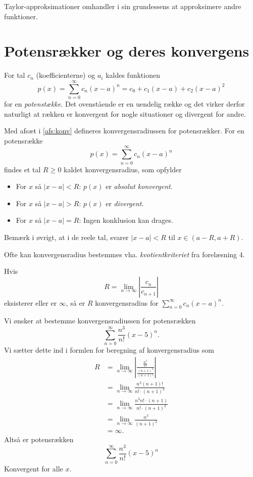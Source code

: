 Taylor-approksimationer omhandler i sin grundessens at approksimere andre funktioner. 

\section{Potensrækker og deres konvergens}
\begin{definition} [Potensrækker]
  For tal $c_n$ (koefficienterne) og $a_i$ kaldes funktionen
  \[ 
  p(x) = \sum_{n = 0}^{\infty} c_n(x-a)^{n} = c_0 + c_1(x-a) + c_2(x-a)^2
  \]
  for en \textit{potenstække}. Det ovenstående er en uendelig række og det virker derfor naturligt at rækken er konvergent for nogle situationer og divergent for andre.
\end{definition}

\begin{sæt} [Konvergensradius]
  Med afsæt i \autoref{afs:konv} defineres konvergensradiussen for potensrækker. For en potensrække
  \[ 
  p(x) = \sum_{n = 0}^{\infty} c_n(x-a)^{n}
  \]
  findes et tal $R \geq 0$ kaldet konvergensradius, som opfylder
  \begin{itemize}
    \item For $x$ så $|x-a| < R$: $p(x)$ er \textit{absolut konvergent}.
    \item For $x$ så $|x-a| > R$: $p(x)$ er \textit{divergent}.
    \item For $x$ så $|x-a| = R$: Ingen konklusion kan drages.
  \end{itemize}
  Bemærk i øvrigt, at i de reele tal, svarer $|x-a| < R$ til $x \in (a-R, a+R)$.
\end{sæt}

\begin{sæt} 
  Ofte kan konvergensradius bestemmes vha. \textit{kvotientkriteriet} fra forelæsning 4.

  Hvis
  \[ 
  R = \lim_{n \to \infty} \left| \frac{c_n}{c_{n+1}} \right|
  \]
  eksisterer eller er $\infty$, så er $R$ konvergensradius for $\sum_{n = 0}^{\infty} c_n (x-a)^{n}$.
\end{sæt}

\begin{eks} 
  Vi ønsker at bestemme konvergensradiussen for potensrækken
  \[ 
  \sum_{n = 0}^{\infty} \frac{n^3}{n!}(x-5)^{n}
  .\]
  \bigbreak
  Vi sætter dette ind i formlen for beregning af konvergensradius som
  \begin{align*}
  R &= \lim_{n \to \infty} \left| \frac{\frac{n^3}{n!}}{\frac{(n+1)^3}{(n+1)!}} \right| \\
  &= \lim_{n \to \infty} \frac{n^3 (n+1)!}{n! \cdot (n+1)^3} \\
  &= \lim_{n \to \infty} \frac{n^3 n! \cdot (n+1)}{n! \cdot (n+1)^3} \\
  &= \lim_{n \to \infty} \frac{n^3}{(n+1)^2} \\
  &= \infty
  .\end{align*}
  Altså er potensrækken
  \[ 
  \sum_{n = 0}^{\infty} \frac{n^3}{n!}(x-5)^{n}
  \]
  Konvergent for alle $x$.
\end{eks}

